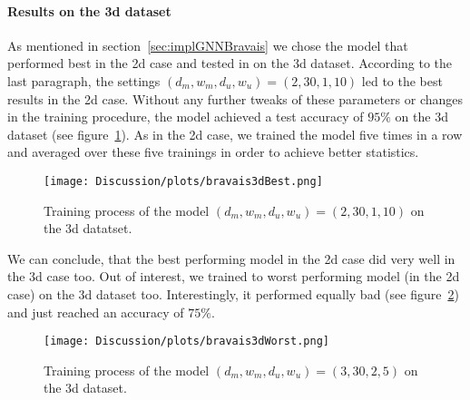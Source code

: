 \paragraph{Results on the 3d dataset}
As mentioned in section~\ref{sec:implGNNBravais} we chose the model that 
performed best in the 2d case and tested in on the 3d dataset. 
According to the last paragraph, the settings $(d_m,w_m,d_u,w_u)=(2, 30, 1, 10)$ led to the best results 
in the 2d case. Without any further tweaks of these parameters or changes in the training procedure,
the model achieved a test accuracy of $95\%$ on the 3d dataset (see figure~\ref{fig:bravaisBest3d}). 
As in the 2d case, we trained the model five times in a row and averaged over these five trainings in order to achieve better statistics.
\begin{figure}[h]
    \centering
    \texttt{[image: Discussion/plots/bravais3dBest.png]}
    \caption{Training process of the model $(d_m,w_m,d_u,w_u)=(2, 30, 1, 10)$ on the 3d datatset.}
    \label{fig:bravaisBest3d}
\end{figure}
We can conclude, that the best performing model in the 2d case did very well in the 3d case too.
Out of interest, we trained to worst performing model (in the 2d case) on the 3d dataset too.
Interestingly, it performed equally bad (see figure~\ref{fig:bravaisWorst3d}) and just reached an accuracy of $75\%$.
\begin{figure}[h]
    \centering
    \texttt{[image: Discussion/plots/bravais3dWorst.png]}
    \caption{Training process of the model $(d_m,w_m,d_u,w_u)=(3, 30, 2, 5)$ on the 3d dataset.}
    \label{fig:bravaisWorst3d}
\end{figure}